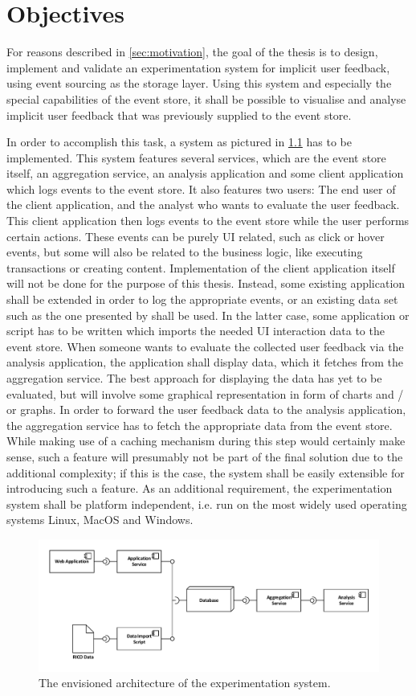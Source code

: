 %
\chapter{Objectives}
\label{sec:objectives}

For reasons described in \cref{sec:motivation}, the goal of the thesis is to design, implement and validate an experimentation system for implicit user feedback, using event sourcing as the storage layer.
Using this system and especially the special capabilities of the event store, it shall be possible to visualise and analyse implicit user feedback that was previously supplied to the event store.

In order to accomplish this task, a system as pictured in \cref{fig:system:vision} has to be implemented.
This system features several services, which are the event store itself, an aggregation service, an analysis application and some client application which logs events to  the event store.
It also features two users: The end user of the client application, and the analyst who wants to evaluate the user feedback.
This client application then logs events to the event store while the user performs certain actions.
These events can be purely UI related, such as click or hover events, but some will also be related to the business logic, like executing transactions or creating content.
Implementation of the client application itself will not be done for the purpose of this thesis.
Instead, some existing application shall be extended in order to log the appropriate events, or an existing data set such as the one presented by \citet{Deka:2017:Rico} shall be used.
In the latter case, some application or script has to be written which imports the needed UI interaction data to the event store.
When someone wants to evaluate the collected user feedback via the analysis application, the application shall display data, which it fetches from the aggregation service.
The best approach for displaying the data has yet to be evaluated, but will involve some graphical representation in form of charts and / or graphs.
In order to forward the user feedback data to the analysis application, the aggregation service has to fetch the appropriate data from the event store.
While making use of a caching mechanism during this step would certainly make sense, such a feature will presumably not be part of the final solution due to the additional complexity; if this is the case, the system shall be easily extensible for introducing such a feature.
As an additional requirement, the experimentation system shall be platform independent, i.e. run on the most widely used operating systems Linux, MacOS and Windows.

\begin{figure}[htb]
        \includegraphics[width=\textwidth]{gfx/architecture-1}
        \caption{The envisioned architecture of the experimentation system.}
        \label{fig:system:vision}
\end{figure}
